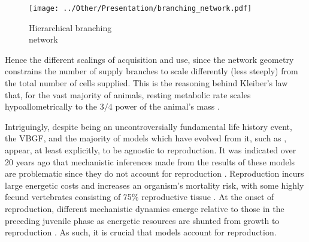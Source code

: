 \documentclass[a4paper]{article} %
\begin{document}
        \begin{wrapfigure}{l}{0.3\textwidth}
            \begin{center}
              \texttt{[image: ../Other/Presentation/branching\_network.pdf]}
            \end{center}
            \caption{Hierarchical branching \\ network}
        \end{wrapfigure}
        
        Hence the different scalings of acquisition and use, since the network geometry constrains the number of supply branches to scale differently (less steeply) from the total number of cells supplied. This is the reasoning behind Kleiber's law that, for the vast majority of animals, resting metabolic rate scales hypoallometrically to the $3/4$ power of the animal's mass \autocite{Kleiber1947}. 

        Intriguingly, despite being an uncontroversially fundamental life history event, the VBGF, and the majority of models which have evolved from it, such as \cite{West2001}, appear, at least explicitly, to be agnostic to reproduction. It was indicated over 20 years ago that mechanistic inferences made from the results of these models are problematic since they do not account for reproduction \autocite{Day1997, Marshall2019b}. Reproduction incurs large energetic costs and increases an organism's mortality risk, with some highly fecund vertebrates consisting of 75\% reproductive tissue \autocite{Parker2018}. At the onset of reproduction, different mechanistic dynamics emerge relative to those in the preceding juvenile phase as energetic resources are shunted from growth to reproduction \autocite{Day1997}. As such, it is crucial that models account for reproduction.
\end{document}
